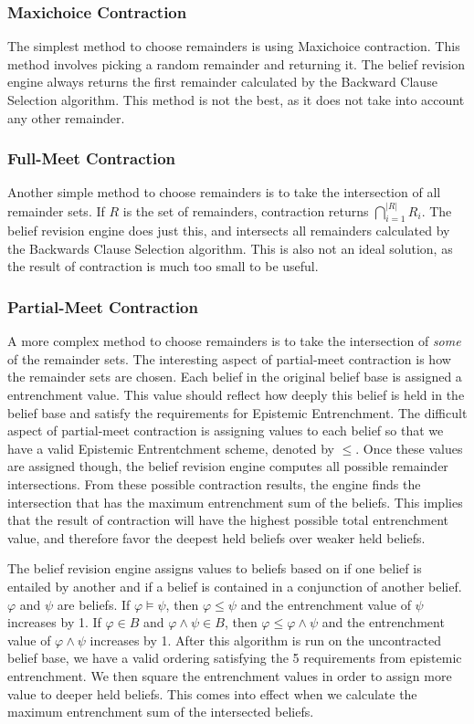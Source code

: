 \documentclass[a4paper,10pt]{article}
\newcommand{\norm}[1]{\lvert #1 \rvert}
\begin{document}
\subsubsection{Maxichoice Contraction}
\label{subsubsec:maxichoice}
The simplest method to choose remainders is using Maxichoice contraction. This method involves picking a random remainder and returning it. The belief revision engine always returns the first remainder calculated by the Backward Clause Selection algorithm. This method is not the best, as it does not take into account any other remainder.

\subsubsection{Full-Meet Contraction}
\label{subsubsec:fullmeet}
Another simple method to choose remainders is to take the intersection of all remainder sets. If $R$ is the set of remainders, contraction returns $\bigcap\limits_{i=1}^{\norm{R}} R_i$. The belief revision engine does just this, and intersects all remainders calculated by the Backwards Clause Selection algorithm. This is also not an ideal solution, as the result of contraction is much too small to be useful.

\subsubsection{Partial-Meet Contraction}
\label{subsubsec:partialmeet}
A more complex method to choose remainders is to take the intersection of \textit{some} of the remainder sets. The interesting aspect of partial-meet contraction is how the remainder sets are chosen. Each belief in the original belief base is assigned a entrenchment value. This value should reflect how deeply this belief is held in the belief base and satisfy the requirements for Epistemic Entrenchment. The difficult aspect of partial-meet contraction is assigning values to each belief so that we have a valid Epistemic Entrentchment scheme, denoted by $\leq$. Once these values are assigned though, the belief revision engine computes all possible remainder intersections. From these possible contraction results, the engine finds the intersection that has the maximum entrenchment sum of the beliefs. This implies that the result of contraction will have the highest possible total entrenchment value, and therefore favor the deepest held beliefs over weaker held beliefs.

The belief revision engine assigns values to beliefs based on if one belief is entailed by another and if a belief is contained in a conjunction of another belief. $\varphi$ and $\psi$ are beliefs. If $\varphi \models \psi$, then $\varphi \leq \psi$ and the entrenchment value of $\psi$ increases by 1. If $\varphi \in B$ and $\varphi\wedge\psi \in B$, then $\varphi\leq\varphi\wedge\psi$ and the entrenchment value of $\varphi\wedge\psi$ increases by 1. After this algorithm is run on the uncontracted belief base, we have a valid ordering satisfying the 5 requirements from epistemic entrenchment. We then square the entrenchment values in order to assign more value to deeper held beliefs. This comes into effect when we calculate the maximum entrenchment sum of the intersected beliefs.
\end{document}
